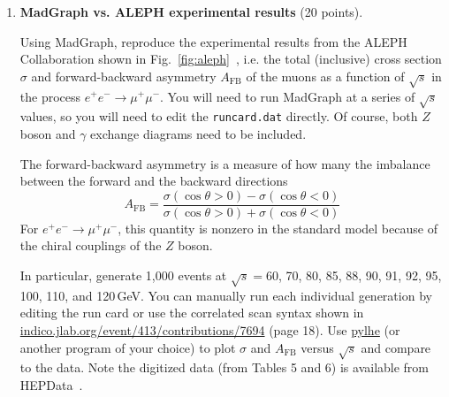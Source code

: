 \documentclass[12pt]{article}
\newif\ifsol
\newcommand{\solColor}{blue}
\newenvironment{solution}{\ifsol\color{\solColor}}{\fi}
\begin{document}
\begin{enumerate}
\begin{solution}
    
\end{solution}

\item \textbf{MadGraph vs. ALEPH experimental results} (20 points).

Using MadGraph, reproduce the experimental results from the ALEPH Collaboration shown in Fig.~\ref{fig:aleph}~\cite{ALEPH:1997gvm}, i.e. the total (inclusive) cross section $\sigma$ and forward-backward asymmetry $A_\mathrm{FB}$ of the muons as a function of $\sqrt{s}$ in the process $e^+e^-\to\mu^+\mu^-$.
You will need to run MadGraph at a series of $\sqrt{s}$ values, so you will need to edit the \texttt{runcard.dat} directly.
Of course, both $Z$ boson and $\gamma$ exchange diagrams need to be included.

The forward-backward asymmetry is a measure of how many the imbalance between the forward and the backward directions
\begin{equation}
    A_\mathrm{FB} = \frac{\sigma(\cos\theta>0) - \sigma(\cos\theta < 0)}{\sigma(\cos\theta > 0) + \sigma(\cos\theta < 0)}
\end{equation}
For $e^+e^-\to\mu^+\mu^-$, this quantity is nonzero in the standard model because of the chiral couplings of the $Z$ boson.

In particular, generate 1,000 events at $\sqrt{s} = 60$, 70, 80, 85, 88, 90, 91, 92, 95, 100, 110, and 120\,GeV.
You can manually run each individual generation by editing the run card or use the correlated scan syntax shown in  \href{https://indico.jlab.org/event/413/contributions/7694}{indico.jlab.org/event/413/contributions/7694} (page 18).
Use \href{https://github.com/scikit-hep/pylhe}{pylhe} (or another program of your choice) to plot $\sigma$ and $A_\mathrm{FB}$ versus $\sqrt{s}$ and compare to the data.
Note the digitized data (from Tables 5 and 6) is available from HEPData~\cite{hepdata.47490}.


\end{enumerate}
\end{document}
